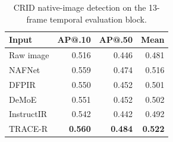 \begin{table}[!t]
\centering
\caption{CRID native-image detection on the 13-frame temporal evaluation block.}
\label{tab:crid}
\footnotesize
\setlength{\tabcolsep}{3.7pt}
\begin{tabular}{lrrr}
\toprule
Input & AP@.10 & AP@.50 & Mean \\
\midrule
Raw image & 0.516 & 0.446 & 0.481 \\
NAFNet & 0.559 & 0.474 & 0.516 \\
DFPIR & 0.550 & 0.452 & 0.501 \\
DeMoE & 0.551 & 0.452 & 0.502 \\
InstructIR & 0.542 & 0.442 & 0.492 \\
TRACE-R & \textbf{0.560} & \textbf{0.484} & \textbf{0.522} \\
\bottomrule
\end{tabular}
\end{table}
